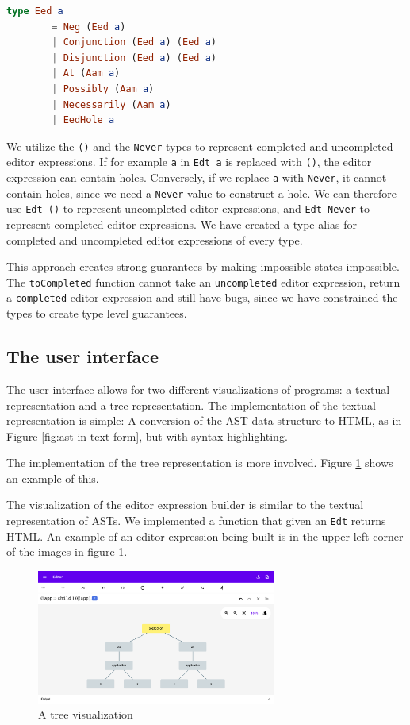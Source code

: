 \begin{lstlisting}[language=elm,%
                   label="eed-definitions",%
                   gobble=4,%
                   ]
    type Eed a
        = Neg (Eed a)
        | Conjunction (Eed a) (Eed a)
        | Disjunction (Eed a) (Eed a)
        | At (Aam a)
        | Possibly (Aam a)
        | Necessarily (Aam a)
        | EedHole a
\end{lstlisting}

We utilize the \texttt{()} and the \texttt{Never} types to represent
completed and uncompleted editor expressions. If for example \texttt{a} in
\texttt{Edt a} is replaced with \texttt{()}, the editor expression can contain
holes. Conversely, if we replace \texttt{a} with \texttt{Never}, it cannot
contain holes, since we need a \texttt{Never} value to construct a hole. We can
therefore use \texttt{Edt ()} to represent uncompleted editor expressions, and
\texttt{Edt Never} to represent completed editor expressions. We have created a
type alias for completed and uncompleted editor expressions of every type.

This approach creates strong guarantees by making impossible states impossible.
The \texttt{toCompleted} function cannot take an \texttt{uncompleted} editor
expression, return a \texttt{completed} editor expression and still have bugs,
since we have constrained the types to create type level guarantees.

\subsection{The user interface}
\label{user-interface}

The user interface allows for two different visualizations of programs: a
textual representation and a tree representation. The implementation of the
textual representation is simple: A conversion of the AST data structure to
HTML, as in Figure \ref{fig:ast-in-text-form}, but with syntax highlighting.

The implementation of the tree representation is more involved. Figure
\ref{fig:final_ui} shows an example of this.

The visualization of the editor expression builder is similar to the textual
representation of ASTs. We implemented a function that given an \texttt{Edt}
returns HTML. An example of an
editor expression being built is in the upper left corner of the images in
figure \ref{fig:final_ui}.


\begin{figure}
  \begin{center}
    \includegraphics[width=0.7\textwidth]{assets/final_ui1.png}
  \end{center}
  \caption{A tree visualization}
  \label{fig:final_ui}
\end{figure}



